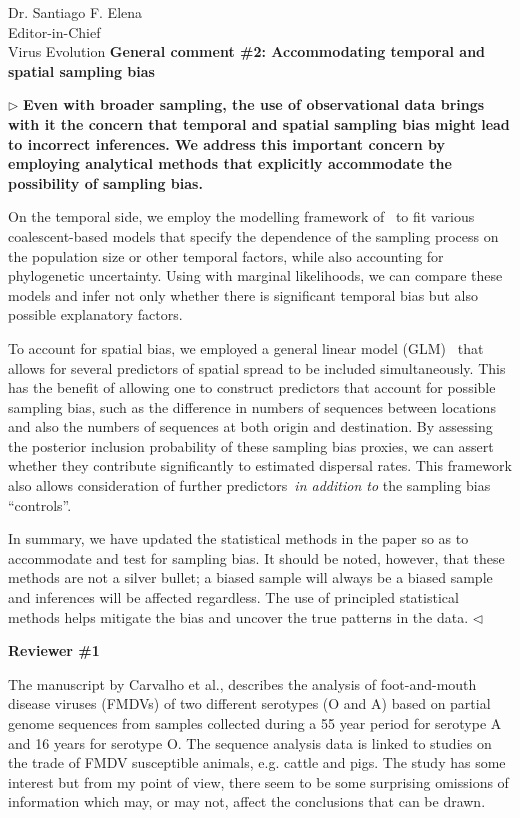 \documentclass[12pt, a4paper]{letter} %
\newenvironment{reply}{$\triangleright$\bf}{$\triangleleft$}
\begin{document}
\begin{letter}{
	Dr. Santiago F. Elena\\
    Editor-in-Chief \\
    Virus Evolution
}
\textbf{General comment \#2: Accommodating temporal and spatial sampling bias}

\begin{reply}
Even with broader sampling, the use of observational data brings with it the concern that temporal and spatial sampling bias might lead to incorrect inferences.
We address this important concern by employing analytical methods that explicitly accommodate the possibility of sampling bias.

On the temporal side, we employ the modelling framework of~\cite{Karcher2020} to fit various coalescent-based models that specify the dependence of the sampling process on the population size or other temporal factors, while also accounting for phylogenetic uncertainty.
Using with marginal likelihoods, we can compare these models and infer not only whether there is significant temporal bias but also possible explanatory factors.

To account for spatial bias, we employed a general linear model (GLM)~\citep{Lemey2014,Dudas2017} that allows for several predictors of spatial spread to be included simultaneously.
This has the benefit of allowing one to construct predictors that account for possible sampling bias, such as the difference in numbers of sequences between locations and also the numbers of sequences at both origin and destination.
By assessing the posterior inclusion probability of these sampling bias proxies, we can assert whether they contribute significantly to estimated dispersal rates.
This framework also allows consideration of further predictors~\textit{in addition to} the sampling bias ``controls''.

In summary, we have updated the statistical methods in the paper so as to accommodate and test for sampling bias.
It should be noted, however, that these methods are not a silver bullet; a biased sample will always be a biased sample and inferences will be affected regardless.
The use of principled statistical methods helps mitigate the bias and uncover the true patterns in the data.
\end{reply}

\textbf{Reviewer \#1}

The manuscript by Carvalho et al., describes the analysis of foot-and-mouth disease viruses (FMDVs) of two different serotypes (O and A) based on partial genome sequences from samples collected during a 55 year period for serotype A and 16 years for serotype O. 
The sequence analysis data is linked to studies on the trade of FMDV susceptible animals, e.g. cattle and pigs. 
The study has some interest but from my point of view, there seem to be some surprising omissions of information which may, or may not, affect the conclusions that can be drawn.


\end{letter}
\end{document}
